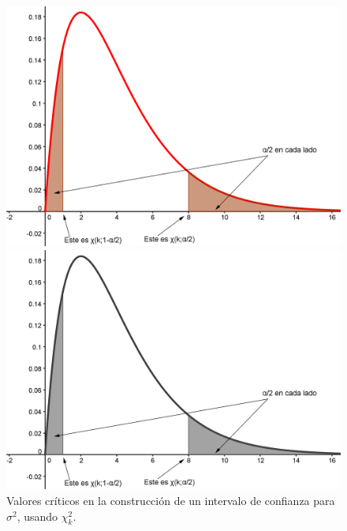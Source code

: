 \begin{figure}[htb]
\begin{center}
\begin{enColor}
\includegraphics[width=13cm]{../fig/Cap06-ChiCuadradoValoresCriticosIntervalo.png}
\end{enColor}
\begin{bn}
\includegraphics[width=13cm]{../fig/Cap06-ChiCuadradoValoresCriticosIntervalo-bn.png}
\end{bn}
\caption{Valores críticos en la construcción de un intervalo de confianza para $\sigma^2$, usando $\chi^2_k$.}
\label{cap06:fig:ChiCuadradoValoresCriticosIntervalo}
\end{center}
\end{figure}

